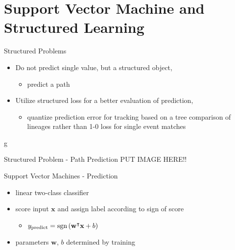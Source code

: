 \section{Support Vector Machine and Structured Learning}

\begin{frame}{Structured Problems}
    \begin{itemize}
          \item Do not predict single value, but a structured object,
        \begin{itemize}
              \item[] \eg predict a path
        \end{itemize}
          \item Utilize structured loss for a better evaluation of prediction, 
        \begin{itemize}
              \item[] \eg quantize prediction error for tracking based on a tree comparison of lineages rather than 1-0 loss for single event matches
        \end{itemize}
    \end{itemize}
\end{frame}g


\begin{frame}{Structured Problem - Path Prediction}
    PUT IMAGE HERE!!
\end{frame}


\begin{frame}{Support Vector Machines - Prediction}
    \begin{itemize}
          \item linear two-class classifier
          \item score input $\textbf{x}$ and assign label according to sign of score
        \begin{itemize}
              \item[] $y_{\text{predict}} = \operatorname{sgn}\left(\textbf{w}^{\intercal}\textbf{x} + b\right)$
        \end{itemize}
          \item parameters $\textbf{w}$, $b$ determined by training
    \end{itemize}
\end{frame}


